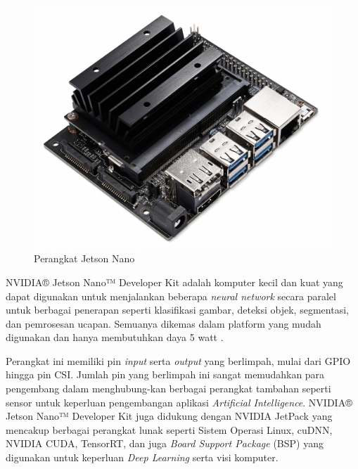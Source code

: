 \begin{figure} [ht] \centering
    \includegraphics[scale=0.25]{gambar/JetsonNano.jpg}
    \caption{Perangkat Jetson Nano}
    \label{fig:Perangkat Jetson Nano}
\end{figure}

NVIDIA® Jetson Nano™ Developer Kit adalah komputer kecil dan kuat yang dapat digunakan untuk menjalankan beberapa \emph{neural network} secara paralel untuk berbagai penerapan seperti klasifikasi gambar, deteksi objek, segmentasi, dan pemrosesan ucapan. Semuanya dikemas dalam platform yang mudah digunakan dan hanya membutuhkan daya 5 watt \parencite{Developer_2023}.

Perangkat ini memiliki pin \emph{input} serta \emph{output} yang berlimpah, mulai dari GPIO hingga pin CSI. Jumlah pin yang berlimpah ini sangat memudahkan para pengembang dalam menghubung-kan berbagai perangkat tambahan seperti sensor untuk keperluan pengembangan aplikasi \emph{Artificial Intelligence}. NVIDIA® Jetson Nano™ Developer Kit juga didukung dengan NVIDIA JetPack yang mencakup berbagai perangkat lunak seperti Sistem Operasi Linux, cuDNN, NVIDIA CUDA, TensorRT, dan juga \emph{Board Support Package} (BSP) yang digunakan untuk keperluan \emph{Deep Learning} serta visi komputer.